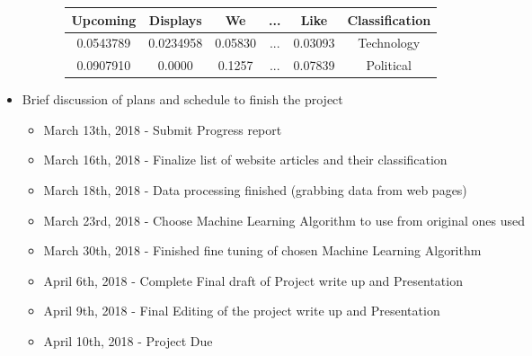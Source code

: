\documentclass[fleqn,11pt]{article}
\begin{document}
\begin{itemize}
\begin{itemize}
\begin{itemize}
            \begin{tabular}{|cccccc|}
              \hline
              Upcoming  & Displays  & We      & ... & Like    & Classification\\
              \hline
              0.0543789 & 0.0234958 & 0.05830 & ... & 0.03093 & Technology\\
              0.0907910 & 0.0000    & 0.1257  & ... & 0.07839 & Political\\
              \hline
            \end{tabular}
          \end{itemize}
      \end{itemize}
      \item Brief discussion of plans and schedule to finish the project
      \begin{itemize}
        \item March 13th, 2018 - Submit Progress report
        \item March 16th, 2018 - Finalize list of website articles and their classification
        \item March 18th, 2018 - Data processing finished (grabbing data from web pages)
        \item March 23rd, 2018 - Choose Machine Learning Algorithm to use from original ones used
        \item March 30th, 2018 - Finished fine tuning of chosen Machine Learning Algorithm
        \item April 6th, 2018 - Complete Final draft of Project write up and Presentation
        \item April 9th, 2018 - Final Editing of the project write up and Presentation
        \item April 10th, 2018 - Project Due
      \end{itemize}
  \end{itemize}
\end{document}

